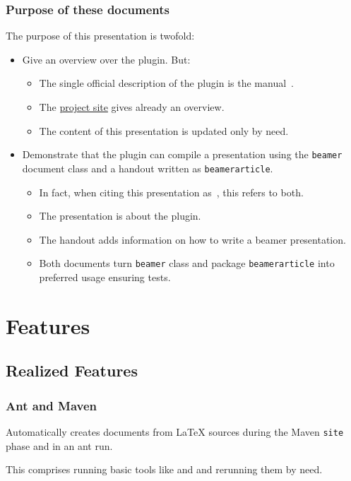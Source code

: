 \begin{frame}
  \frametitle{Purpose of these documents }
  The purpose of this presentation is twofold:
  \begin{itemize}
    \item Give an overview over the plugin. 
    \alert{But: }
    \begin{itemize}
      \item The single official description of the plugin is the manual~\cite{LatexPlugin}.
      \item The 
      \href{http://simuline.eu/LatexMavenPlugin/index.html}{project site} 
      gives already an overview. 
      \item 
      The content of this presentation is updated only by need. 
    \end{itemize}
    
    \item Demonstrate that the plugin can compile a presentation using the \texttt{beamer} document class 
    and a handout written as \texttt{beamerarticle}. 

    \begin{itemize}
      \item In fact, when citing this presentation as~\cite{PresBeamer}, 
      this refers to both. 
      \item The presentation is about the plugin. 
      \item The handout adds information on how to write a beamer presentation. 
      \item Both documents turn \texttt{beamer} class and package \texttt{beamerarticle} into preferred usage 
      ensuring tests. 
    \end{itemize}
  \end{itemize}
  
\end{frame}


\section{Features}

\subsection{Realized Features}

\begin{frame}
  \frametitle{Ant and Maven}
  Automatically creates documents from LaTeX sources during the Maven \texttt{site} phase 
  and in an ant run. 

  This comprises running basic tools like  and  
  and rerunning them by need. 

\end{frame}

